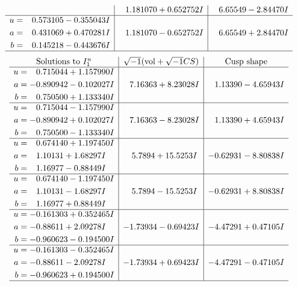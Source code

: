 \documentclass[1p]{elsarticle_modified}
\theoremstyle{definition}
\newcommand{\I}{\sqrt{-1}}
\begin{document}
$$\begin{array}{c|c|c}
 & \phantom{-}1.181070 + 0.652752 I & \phantom{-}6.65549 - 2.84470 I \\ \hline\begin{aligned}
u &= \phantom{-}0.573105 - 0.355043 I \\
a &= \phantom{-}0.431069 + 0.470281 I \\
b &= \phantom{-}0.145218 - 0.443676 I\end{aligned}
 & \phantom{-}1.181070 - 0.652752 I & \phantom{-}6.65549 + 2.84470 I\\
 \hline 
 \end{array}$$\newpage$$\begin{array}{c|c|c}  
\text{Solutions to }I^u_{1}& \I (\text{vol} + \sqrt{-1}CS) & \text{Cusp shape}\\
 \hline 
\begin{aligned}
u &= \phantom{-}0.715044 + 1.157990 I \\
a &= -0.890942 - 0.102027 I \\
b &= \phantom{-}0.750500 + 1.133340 I\end{aligned}
 & \phantom{-}7.16363 + 8.23028 I & \phantom{-}1.13390 - 4.65943 I \\ \hline\begin{aligned}
u &= \phantom{-}0.715044 - 1.157990 I \\
a &= -0.890942 + 0.102027 I \\
b &= \phantom{-}0.750500 - 1.133340 I\end{aligned}
 & \phantom{-}7.16363 - 8.23028 I & \phantom{-}1.13390 + 4.65943 I \\ \hline\begin{aligned}
u &= \phantom{-}0.674140 + 1.197450 I \\
a &= \phantom{-}1.10131 + 1.68297 I \\
b &= \phantom{-}1.16977 - 0.88449 I\end{aligned}
 & \phantom{-}5.7894 + 15.5253 I & -0.62931 - 8.80838 I \\ \hline\begin{aligned}
u &= \phantom{-}0.674140 - 1.197450 I \\
a &= \phantom{-}1.10131 - 1.68297 I \\
b &= \phantom{-}1.16977 + 0.88449 I\end{aligned}
 & \phantom{-}5.7894 - 15.5253 I & -0.62931 + 8.80838 I \\ \hline\begin{aligned}
u &= -0.161303 + 0.352465 I \\
a &= -0.88611 + 2.09278 I \\
b &= -0.960623 - 0.194500 I\end{aligned}
 & -1.73934 - 0.69423 I & -4.47291 + 0.47105 I \\ \hline\begin{aligned}
u &= -0.161303 - 0.352465 I \\
a &= -0.88611 - 2.09278 I \\
b &= -0.960623 + 0.194500 I\end{aligned}
 & -1.73934 + 0.69423 I & -4.47291 - 0.47105 I\\
 \hline 
 \end{array}$$\newpage\newpage\renewcommand{\arraystretch}{1}
\end{document}
